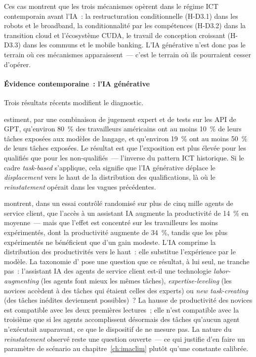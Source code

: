 Ces cas montrent que les trois m\'ecanismes op\`erent dans le r\'egime ICT contemporain avant l'IA~: la restructuration conditionnelle (H-D3.1) dans les robots et le broadband, la conditionnalit\'e par les comp\'etences (H-D3.2) dans la transition cloud et l'\'ecosyst\`eme CUDA, le travail de conception croissant (H-D3.3) dans les communs et le mobile banking. L'IA g\'en\'erative n'est donc pas le terrain o\`u ces m\'ecanismes apparaissent~--- c'est le terrain o\`u ils pourraient cesser d'op\'erer.

\paragraph{Évidence contemporaine~: l'IA générative}

Trois résultats récents modifient le diagnostic.

\textcite{eloundou_gpts_2023} estiment, par une combinaison de jugement expert et de tests sur les API de GPT, qu'environ 80~\% des travailleurs américains ont au moins 10~\% de leurs tâches exposées aux modèles de langage, et qu'environ 19~\% ont au moins 50~\% de leurs tâches exposées. Le résultat est que l'exposition est plus élevée pour les qualifiés que pour les non-qualifiés~--- l'inverse du pattern ICT historique. Si le cadre \emph{task-based} s'applique, cela signifie que l'IA générative déplace le \emph{displacement} vers le haut de la distribution des qualifications, là où le \emph{reinstatement} opérait dans les vagues précédentes.

\textcite{brynjolfsson_generative_2023} montrent, dans un essai contrôlé randomisé sur plus de cinq mille agents de service client, que l'accès à un assistant IA augmente la productivité de 14~\% en moyenne~--- mais que l'effet est concentré sur les travailleurs les moins expérimentés, dont la productivité augmente de 34~\%, tandis que les plus expérimentés ne bénéficient que d'un gain modeste. L'IA comprime la distribution des productivités vers le haut~: elle substitue l'expérience par le modèle. La taxonomie d'\textcite{acemoglu_building_2026} pose une question que ce résultat, à lui seul, ne tranche pas~: l'assistant IA des agents de service client est-il une technologie \emph{labor-augmenting} (les agents font mieux les mêmes tâches), \emph{expertise-leveling} (les novices accèdent à des tâches qui étaient celles des experts) ou \emph{new task-creating} (des tâches inédites deviennent possibles)~? La hausse de productivité des novices est compatible avec les deux premières lectures~; elle n'est compatible avec la troisième que si les agents accomplissent désormais des tâches qu'aucun agent n'exécutait auparavant, ce que le dispositif de \textcite{brynjolfsson_generative_2023} ne mesure pas. La nature du \emph{reinstatement} observé reste une question ouverte~--- ce qui justifie d'en faire un paramètre de scénario au chapitre~\ref{ch:imaclim} plutôt qu'une constante calibrée.


